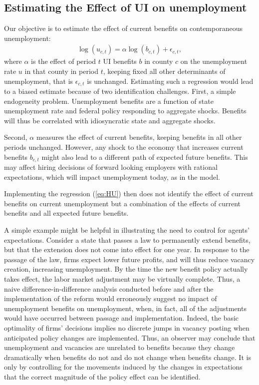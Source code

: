 \documentclass[12pt]{article}
\newcommand{\1}{\mathbf{1}}
\newcommand{\beq}{\begin{eqnarray}}
\newcommand{\eeq}{\end{eqnarray}}
\begin{document}
\subsection{ \hspace{-.4cm} Estimating the Effect of UI on unemployment}
\label{sec:basic}
Our objective is to estimate the effect of current benefits on contemporaneous unemployment: 
\beq \label{eq:HU}
\log(u_{c,t}) = \alpha \log(b_{c,t}) + \epsilon_{c,t},
\eeq
where $\alpha$ is  the effect of period $t$ UI benefits $b$ in county $c$ on the unemployment rate $u$ in that county in period $t$, keeping fixed all other determinants of unemployment, that is $\epsilon_{c,t}$ is unchanged. Estimating such a regression would lead to a biased estimate because of two identification challenges. First, a simple endogeneity problem. Unemployment benefits are a function of state unemployment rate and federal policy responding to aggregate shocks. Benefits will thus be correlated with idiosyncratic state and aggregate shocks.






Second, $\alpha$ measures the effect of current benefits, keeping benefits in all other periods unchanged. However, any shock to the economy that increases current benefits $b_{c,t}$ might also lead to a different path of expected future benefits. This may affect hiring decisions of forward looking employers with rational expectations, which will impact unemployment today, as in the \cite{pissarides:00} model.

 Implementing the regression (\ref{eq:HU}) then does not identify the effect of current benefits on current unemployment but a combination of the effects of current benefits and all expected future benefits. 

A simple example might be helpful in illustrating the need to control for agents' expectations.  Consider a state that passes a law to permanently extend benefits, but that the extension does not come into effect for one year. In response to the passage of the law, firms expect lower future profits, and will thus reduce vacancy creation, increasing unemployment. By the time the new benefit policy actually takes effect, the labor market adjustment may be virtually complete. Thus, a naive difference-in-difference analysis conducted before and after the implementation of the reform would erroneously suggest no impact of unemployment benefits on unemployment, when, in fact, all of the adjustments would have occurred between passage and implementation. Indeed, the basic optimality of firms' decisions implies no discrete jumps in vacancy posting when anticipated policy changes are implemented. Thus, an observer may conclude that unemployment and vacancies are unrelated to benefits because they change dramatically when benefits do not and do not change when benefits change. It is only by controlling for the movements induced by the changes in expectations that the correct magnitude of the policy effect can be identified.
\end{document}

